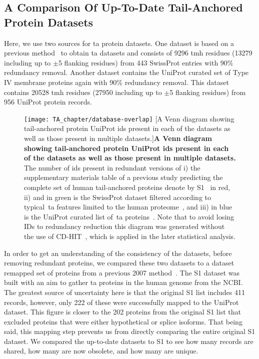 \subsection{A Comparison Of Up-To-Date Tail-Anchored Protein Datasets}
Here, we use two sources for \gls{ta} protein datasets.
One dataset is based on a previous method~\cite{Kalbfleisch2007} to obtain \gls{ta} datasets and consists of 9296 \gls{tmh} residues (13279 including up to $\pm$5 flanking residues) from 443 SwissProt entries with 90\% redundancy removal.
Another dataset contains the UniProt curated set of Type IV membrane proteins again with 90\% redundancy removal.
This dataset contains 20528 \gls{tmh} residues (27950 including up to $\pm$5 flanking residues) from 956 UniProt protein records.

\begin{figure}
\centering
\texttt{[image: TA\_chapter/database-overlap]}
        [A Venn diagram showing tail-anchored protein UniProt ids present in each of the datasets as well as those present in multiple datasets.]{\textbf{A Venn diagram showing tail-anchored protein UniProt ids present in each of the datasets as well as those present in multiple datasets.}
The number of ids present in redundant versions of
i) the supplementary materials table of a previous study predicting the complete set of human tail-anchored proteins denote by S1~\cite{Kalbfleisch2007} in red,
ii) and in green is the SwissProt dataset filtered according to typical~\gls{ta} features limited to the human proteome~\cite{TheUniProtConsortium2014}, and
iii) in blue is the UniProt curated list of~\gls{ta} proteins~\cite{TheUniProtConsortium2014}.
Note that to avoid losing IDs to redundancy reduction this diagram was generated without the use of CD-HIT~\cite{Huang2010, Wu2011}, which is applied in the later statistical analysis.}

\label{fig:tadatasetoverlap}
\end{figure}

In order to get an understanding of the consistency of the datasets, before removing redundant proteins, we compared these two datasets to a dataset remapped set of proteins from a previous 2007 method~\cite{Kalbfleisch2007}.
The S1 dataset was built with an aim to gather \gls{ta} proteins in the human genome from the NCBI.
The greatest source of uncertainty here is that the original S1 list includes 411 records, however, only 222 of these were successfully mapped to the UniProt dataset.
This figure is closer to the 202 proteins from the original S1 list that excluded proteins that were either hypothetical or splice isoforms.
That being said, this mapping step prevents us from directly comparing the entire original S1 dataset.
We compared the up-to-date datasets to S1 to see how many records are shared, how many are now obsolete, and how many are unique.

